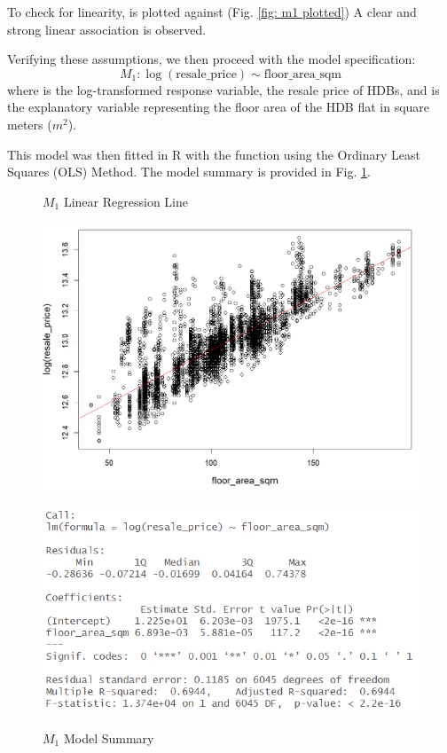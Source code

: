 \begin{figure}
    
\end{figure}

To check for linearity,  is plotted against  (Fig. \ref{fig: m1 plotted}) A clear and strong linear association is observed.

Verifying these assumptions, we then proceed with the model specification:
\[M_1: \log(\text{resale\_price}) \sim \text{floor\_area\_sqm}\]
where  is the log-transformed response variable, the resale price of HDBs, and   is the explanatory variable representing the floor area of the HDB flat in square meters ($m^2$).

This model was then fitted in R with the  function using the Ordinary Least Squares (OLS) Method. The model summary is provided in Fig. \ref{fig: m1 model summary}.

\begin{figure}[!htp]
\centering
\begin{minipage}[t]{0.45\textwidth}
  \centering
  \caption{$M_1$ Linear Regression Line}
  \label{fig: m1 plotted}
  \includegraphics[width=\textwidth]{images/Screenshot 2023-04-11 201739.png}
\end{minipage}\hfill
\begin{minipage}[t]{0.49\textwidth}
  \centering
  \caption{$M_1$ Model Summary}
  \includegraphics[width=\textwidth]{images/Screenshot 2023-04-11 201612.png}
  \label{fig: m1 model summary}
\end{minipage}
\end{figure}


